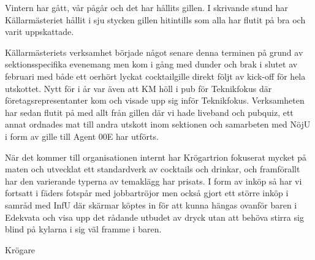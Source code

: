 \documentclass[../_main/handlingar.tex]{subfiles}
\begin{document}
Vintern har gått, vår pågår och det har hållits gillen. I skrivande stund har Källarmästeriet hållit i sju stycken gillen hitintills som alla har flutit på bra och varit uppskattade.

Källarmästeriets verksamhet började något senare denna terminen på grund av sektionsspecifika evenemang men kom i gång med dunder och brak i slutet av februari med både ett oerhört lyckat cocktailgille direkt följt av kick-off för hela utskottet. Nytt för i år var även att KM höll i pub för Teknikfokus där företagsrepresentanter kom och visade upp sig inför Teknikfokus. Verksamheten har sedan flutit på med allt från gillen där vi hade liveband och pubquiz, ett annat ordnades mat till andra utskott inom sektionen och samarbeten med NöjU i form av gille till Agent 00E har utförts.

När det kommer till organisationen internt har Krögartrion fokuserat mycket på maten och utvecklat ett standardverk av cocktails och drinkar, och framförallt har den varierande typerna av temaklägg har prisats. I form av inköp så har vi fortsatt i fäders fotspår med jobbartröjor men också gjort ett större inköp i samråd med InfU där skärmar köptes in för att kunna hängas ovanför baren i Edekvata och visa upp det rådande utbudet av dryck utan att behöva stirra sig blind på kylarna i sig väl framme i baren.


\begin{signatures}{1}
    \mvh
    \signature{Malin Heyden}{Krögare}
\end{signatures}
\end{document}
